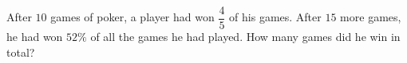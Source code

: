 After $10$ games of poker, a player had won $\dfrac{4}{5}$ of his games. After $15$ more games, he had won $52\%$ of all the games he had played. How many games did he win in total?

